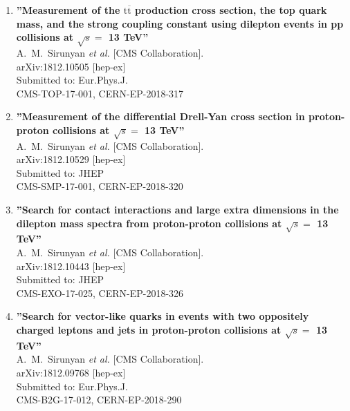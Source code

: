 \begin{enumerate}
\item%
{\bf ''Measurement of the $\mathrm{t}\overline{\mathrm{t}}$ production cross section, the top quark mass, and the strong coupling constant using dilepton events in pp collisions at $\sqrt{s}=$ 13 TeV''}
  \\{}A.~M.~Sirunyan {\it et al.} [CMS Collaboration].
  \\{}arXiv:1812.10505 [hep-ex]
  \\{}Submitted to: Eur.Phys.J.
  \\{}CMS-TOP-17-001, CERN-EP-2018-317

\item%
{\bf ''Measurement of the differential Drell-Yan cross section in proton-proton collisions at $\sqrt{s} =$ 13 TeV''}
  \\{}A.~M.~Sirunyan {\it et al.} [CMS Collaboration].
  \\{}arXiv:1812.10529 [hep-ex]
  \\{}Submitted to: JHEP
  \\{}CMS-SMP-17-001, CERN-EP-2018-320

\item%
{\bf ''Search for contact interactions and large extra dimensions in the dilepton mass spectra from proton-proton collisions at $\sqrt{s}=$ 13 TeV''}
  \\{}A.~M.~Sirunyan {\it et al.} [CMS Collaboration].
  \\{}arXiv:1812.10443 [hep-ex]
  \\{}Submitted to: JHEP
  \\{}CMS-EXO-17-025, CERN-EP-2018-326

\item%
{\bf ''Search for vector-like quarks in events with two oppositely charged leptons and jets in proton-proton collisions at $\sqrt{s} =$ 13 TeV''}
  \\{}A.~M.~Sirunyan {\it et al.} [CMS Collaboration].
  \\{}arXiv:1812.09768 [hep-ex]
  \\{}Submitted to: Eur.Phys.J.
  \\{}CMS-B2G-17-012, CERN-EP-2018-290


\end{enumerate}
